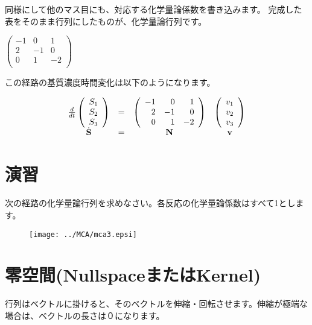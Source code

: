 同様にして他のマス目にも、対応する化学量論係数を書き込みます。
完成した表をそのまま行列にしたものが、化学量論行列です。
\begin{center}
\(
\left(
\begin{array}{rrr}
 -1  &  0  & 1 \\
  2  &  -1 & 0 \\
  0  &  1 & -2\\ 
\end{array}
\right)
\)
\end{center}

この経路の基質濃度時間変化は以下のようになります。

\[
\begin{array}{cccc}
\frac{d}{dt}
\left(
\begin{array}{l}
S_1 \\
S_2 \\
S_3 \\ 
\end{array}
\right)
& = &
\left(
\begin{array}{rrr}
 -1  &  0  & 1 \\
  2  &  -1 & 0 \\
  0  &  1 & -2\\ 
\end{array}
\right)
&
\left(
\begin{array}{l}
v_1 \\
v_2 \\
v_3 \\ 
\end{array}
\right)\\
\dot{\bf S} & = & {\bf N} & {\bf v} \\
\end{array}
\]

\section{演習}
次の経路の化学量論行列を求めなさい。各反応の化学量論係数はすべて1とします。
\begin{figure}[h]
\begin{center}
\texttt{[image: ../MCA/mca3.epsi]}
\end{center}
\end{figure}

\section{零空間(NullspaceまたはKernel)}
行列はベクトルに掛けると、そのベクトルを伸縮・回転させます。伸縮が極端な場合は、ベクトルの長さは０になります。


